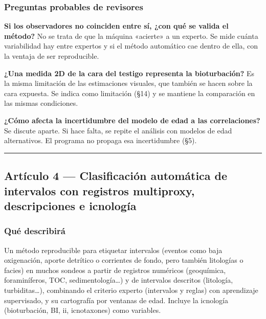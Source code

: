 \documentclass[
  10pt,
]{article}
\begin{document}
\hypertarget{preguntas-probables-de-revisores-1}{%
\subsubsection{Preguntas probables de
revisores}\label{preguntas-probables-de-revisores-1}}

\textbf{Si los observadores no coinciden entre sí, ¿con qué se valida el
método?} No se trata de que la máquina «acierte» a un experto. Se mide
cuánta variabilidad hay entre expertos y si el método automático cae
dentro de ella, con la ventaja de ser reproducible.

\textbf{¿Una medida 2D de la cara del testigo representa la
bioturbación?} Es la misma limitación de las estimaciones visuales, que
también se hacen sobre la cara expuesta. Se indica como limitación (§14)
y se mantiene la comparación en las mismas condiciones.

\textbf{¿Cómo afecta la incertidumbre del modelo de edad a las
correlaciones?} Se discute aparte. Si hace falta, se repite el análisis
con modelos de edad alternativos. El programa no propaga esa
incertidumbre (§5).

\begin{center}\rule{0.5\linewidth}{0.5pt}\end{center}

\hypertarget{artuxedculo-4-clasificaciuxf3n-automuxe1tica-de-intervalos-con-registros-multiproxy-descripciones-e-icnologuxeda}{%
\subsection{Artículo 4 --- Clasificación automática de intervalos con
registros multiproxy, descripciones e
icnología}\label{artuxedculo-4-clasificaciuxf3n-automuxe1tica-de-intervalos-con-registros-multiproxy-descripciones-e-icnologuxeda}}

\hypertarget{quuxe9-describiruxe1-2}{%
\subsubsection{Qué describirá}\label{quuxe9-describiruxe1-2}}

Un método reproducible para etiquetar intervalos (eventos como baja
oxigenación, aporte detrítico o corrientes de fondo, pero también
litologías o facies) en muchos sondeos a partir de registros numéricos
(geoquímica, foraminíferos, TOC, sedimentología\ldots) y de intervalos
descritos (litología, turbiditas\ldots), combinando el criterio experto
(intervalos y reglas) con aprendizaje supervisado, y su cartografía por
ventanas de edad. Incluye la icnología (bioturbación, BI, ii,
icnotaxones) como variables.
\end{document}

